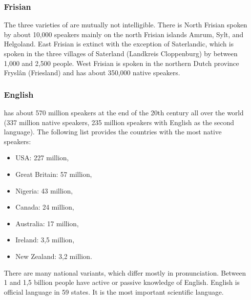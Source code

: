 \subsubsection{Frisian}

The three varieties of  are mutually not intelligible. There is North Frisian spoken by
about 10,000 speakers mainly on the north Frisian islands Amrum, Sylt, and Helgoland. East Frisian
is extinct with the exception of Saterlandic, which is spoken in the three villages of Saterland
(Landkreis Cloppenburg) by between 1,000 and 2,500 people.
West Frisian is spoken in the northern Dutch province Fryslân (Friesland) and has about 350,000
native speakers.



\subsubsection{English}

 has about 570 million speakers at the end of the 20th century all over the world (337
million native speakers, 235 million speakers with English as the second language). The following
list provides the countries with the most native speakers: 
\begin{itemize}
\item USA: 227 million,
\item Great Britain: 57 million,
\item Nigeria: 43 million, 
\item Canada: 24 million,
\item Australia: 17 million,
\item Ireland: 3,5 million,
\item New Zealand: 3,2 million.
\end{itemize}
There are many national variants, which differ mostly in pronunciation.
Between 1 and  1,5 billion people have active or passive knowledge of English.
English is official language in 59 states. It is the most important scientific language.




